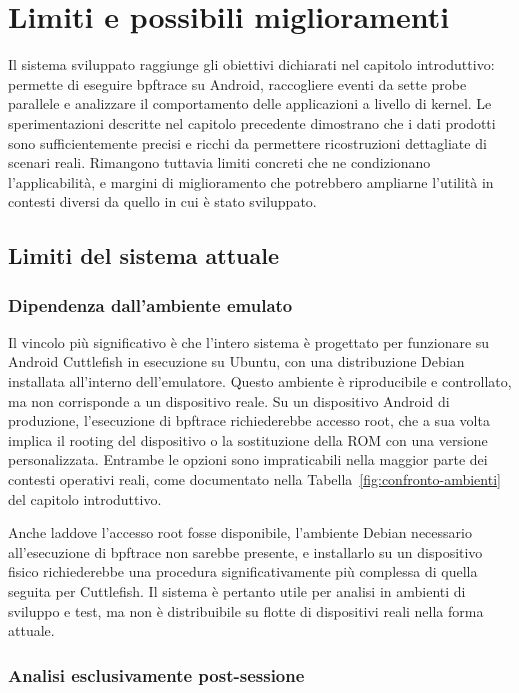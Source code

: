 \chapter{Limiti e possibili miglioramenti}

Il sistema sviluppato raggiunge gli obiettivi dichiarati nel capitolo introduttivo: permette di eseguire bpftrace su Android, raccogliere eventi da sette probe parallele e analizzare il comportamento delle applicazioni a livello di kernel. Le sperimentazioni descritte nel capitolo precedente dimostrano che i dati prodotti sono sufficientemente precisi e ricchi da permettere ricostruzioni dettagliate di scenari reali. Rimangono tuttavia limiti concreti che ne condizionano l'applicabilità, e margini di miglioramento che potrebbero ampliarne l'utilità in contesti diversi da quello in cui è stato sviluppato.

\section{Limiti del sistema attuale}

\subsection{Dipendenza dall'ambiente emulato}

Il vincolo più significativo è che l'intero sistema è progettato per funzionare su Android Cuttlefish in esecuzione su Ubuntu, con una distribuzione Debian installata all'interno dell'emulatore. Questo ambiente è riproducibile e controllato, ma non corrisponde a un dispositivo reale. Su un dispositivo Android di produzione, l'esecuzione di bpftrace richiederebbe accesso root, che a sua volta implica il rooting del dispositivo o la sostituzione della ROM con una versione personalizzata. Entrambe le opzioni sono impraticabili nella maggior parte dei contesti operativi reali, come documentato nella Tabella~\ref{fig:confronto-ambienti} del capitolo introduttivo.

Anche laddove l'accesso root fosse disponibile, l'ambiente Debian necessario all'esecuzione di bpftrace non sarebbe presente, e installarlo su un dispositivo fisico richiederebbe una procedura significativamente più complessa di quella seguita per Cuttlefish. Il sistema è pertanto utile per analisi in ambienti di sviluppo e test, ma non è distribuibile su flotte di dispositivi reali nella forma attuale.

\subsection{Analisi esclusivamente post-sessione}

